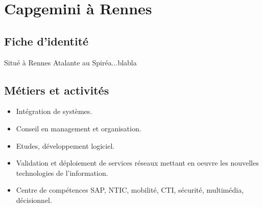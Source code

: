 \chapter{Capgemini à Rennes}
\section{Fiche d'identité}
Situé à Rennes Atalante au Spiréa...blabla
\section{Métiers et activités}
\begin{itemize}
\item Intégration de systèmes.
\item Conseil en management et organisation.
\item Etudes, développement logiciel.
\item Validation et déploiement de services réseaux mettant en oeuvre les nouvelles technologies de l'information.
\item Centre de compétences SAP, NTIC, mobilité, CTI, sécurité, multimédia, décisionnel.
\end{itemize}
